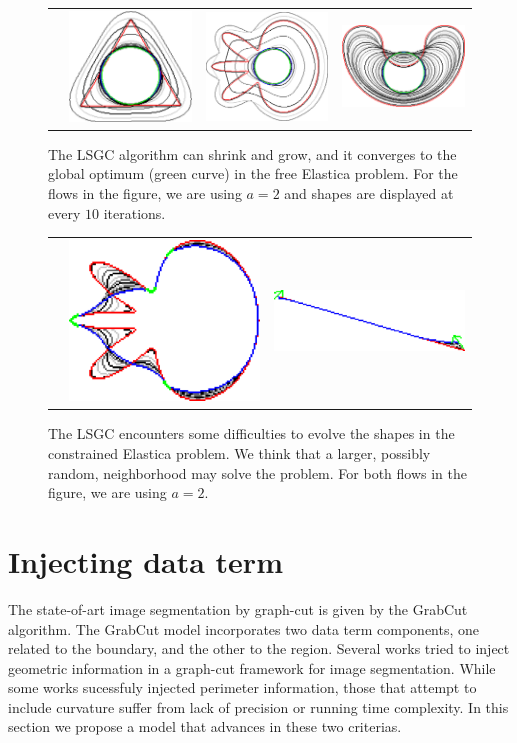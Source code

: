 \begin{figure}
\begin{tabular}{cccc}
&\includegraphics[scale=0.25]{figures/chapter8/graph-flow/triangle/neigh-2/summary.pdf} & \includegraphics[scale=0.25]{figures/chapter8/graph-flow/flower/neigh-2/summary.pdf} & \includegraphics[scale=0.25]{figures/chapter8/graph-flow/bean/neigh-2/summary.pdf}
\end{tabular}
\caption{The LSGC algorithm can shrink and grow, and it converges to the global optimum (green curve) in the free Elastica problem. For the flows in the figure, we are using $a=2$ and shapes are displayed at every $10$ iterations.}
\label{fig:graph-flow-neigh2-results}
\end{figure}


\begin{figure}
\begin{tabular}{ccc}
&\includegraphics[scale=0.4]{figures/chapter8/constrained-elastica/flower-1/lp-0.001/summary.pdf} & \includegraphics[scale=0.4]{figures/chapter8/constrained-elastica/curve-3/lp-0.001/summary.pdf}
\end{tabular}
\caption{The LSGC encounters some difficulties to evolve the shapes in the constrained Elastica problem. We think that a larger, possibly random, neighborhood may solve the problem. For both flows in the figure, we are using $a=2$.}
\label{fig:graph-flow-constrained}
\end{figure}

\section{Injecting data term}

The state-of-art image segmentation by graph-cut is given by the GrabCut algorithm. The GrabCut model incorporates two data term components, one related to the boundary, and the other to the region. Several works tried to inject geometric information in a graph-cut framework for image segmentation. While some works sucessfuly injected perimeter information, those that attempt to include curvature suffer from lack of precision or running time complexity. In this section we propose a model that advances in these two criterias.
